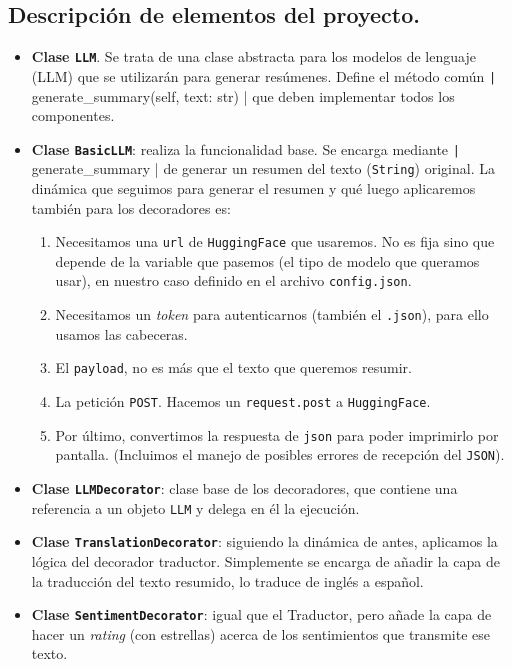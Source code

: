 \documentclass[a4paper,12pt]{article}
\begin{document}
		\subsection{Descripción de elementos del proyecto.}
			\begin{itemize}
				\item \textbf{Clase \texttt{LLM}}. Se trata de una clase abstracta para los modelos de lenguaje (LLM) que se utilizarán para generar resúmenes. Define el método común \texttt| generate_summary(self, text: str) | que deben implementar todos los componentes.
				
				\item \textbf{Clase \texttt{BasicLLM}}: realiza la funcionalidad base. Se encarga mediante \texttt| generate_summary | de generar un resumen del texto (\texttt{String}) original. 
				La dinámica que seguimos para generar el resumen y qué luego aplicaremos también para los decoradores es:
				\begin{enumerate}
					\item Necesitamos una \texttt{url} de \texttt{HuggingFace} que usaremos. No es fija sino que depende de la variable que pasemos (el tipo de modelo que queramos usar), en nuestro caso definido en el archivo \texttt{config.json}.
					
					\item  Necesitamos un \textit{token} para autenticarnos (también el \texttt{.json}), para ello usamos las cabeceras. 
					
					\item El \texttt{payload}, no es más que el texto que queremos resumir.
					
					\item La petición \texttt{POST}. Hacemos un \texttt{request.post} a \texttt{HuggingFace}.
					
					\item Por último, convertimos la respuesta de \texttt{json} para poder imprimirlo por pantalla. (Incluimos el manejo de posibles errores de recepción del \texttt{JSON}).
				\end{enumerate}
				
				\item \textbf{Clase \texttt{LLMDecorator}}: clase base de los decoradores, que contiene una referencia a un objeto \texttt{LLM} y delega en él la ejecución.
				
				\item \textbf{Clase \texttt{TranslationDecorator}}: siguiendo la dinámica de antes, aplicamos la lógica del decorador traductor. Simplemente se encarga de añadir la capa de la traducción del texto resumido, lo traduce de inglés a español.
				
				\item \textbf{Clase \texttt{SentimentDecorator}}: igual que el Traductor, pero añade la capa de hacer un \textit{rating} (con estrellas) acerca de los sentimientos que transmite ese texto. 			
			\end{itemize}
			
\end{document}
